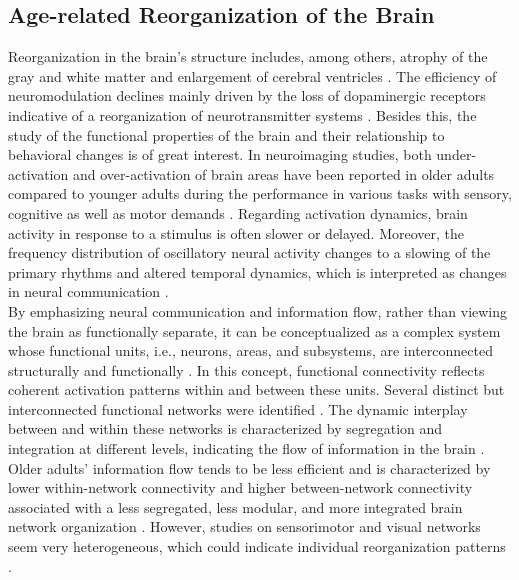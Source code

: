 \subsection{Age-related Reorganization of the Brain}
\label{theory:aging:brain}
Reorganization in the brain's structure includes, among others, atrophy of the gray and white matter and enlargement of cerebral ventricles \cite{Fjell2010}. The efficiency of neuromodulation declines mainly driven by the loss of dopaminergic receptors indicative of a reorganization of neurotransmitter systems \cite{Li2001}. Besides this, the study of the functional properties of the brain and their relationship to behavioral changes is of great interest. In neuroimaging studies, both under-activation and over-activation of brain areas have been reported in older adults compared to younger adults during the performance in various tasks with sensory, cognitive as well as motor demands \cite{Reuter-Lorenz2010, Sala-Llonch2015}. Regarding activation dynamics, brain activity in response to a stimulus is often slower or delayed. Moreover, the frequency distribution of oscillatory neural activity changes to a slowing of the primary rhythms and altered temporal dynamics, which is interpreted as changes in neural communication \cite{Courtney2021}.\\ 
By emphasizing neural communication and information flow, rather than viewing the brain as functionally separate, it can be conceptualized as a complex system whose functional units, i.e., neurons, areas, and subsystems, are interconnected structurally and functionally \cite{Friston2011,Deery2023}. In this concept, functional connectivity reflects coherent activation patterns within and between these units. Several distinct but interconnected functional networks were identified \cite{Uddin2019}. The dynamic interplay between and within these networks is characterized by segregation and integration at different levels, indicating the flow of information in the brain \cite{Sporns2013}. Older adults' information flow tends to be less efficient and is characterized by lower within-network connectivity and higher between-network connectivity associated with a less segregated, less modular, and more integrated brain network organization \cite{Sala-Llonch2015,Deery2023, Betzel2014}. However, studies on sensorimotor and visual networks seem very heterogeneous, which could indicate individual reorganization patterns \cite{Deery2023}.


